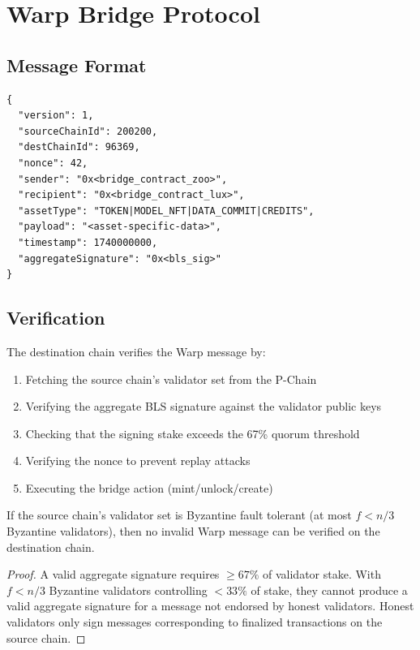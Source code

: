 \section{Warp Bridge Protocol}

\label{sec:warp}

\subsection{Message Format}

\begin{lstlisting}[basicstyle=\ttfamily\small,caption=Zoo Bridge Warp Message]
{
  "version": 1,
  "sourceChainId": 200200,
  "destChainId": 96369,
  "nonce": 42,
  "sender": "0x<bridge_contract_zoo>",
  "recipient": "0x<bridge_contract_lux>",
  "assetType": "TOKEN|MODEL_NFT|DATA_COMMIT|CREDITS",
  "payload": "<asset-specific-data>",
  "timestamp": 1740000000,
  "aggregateSignature": "0x<bls_sig>"
}
\end{lstlisting}

\subsection{Verification}

The destination chain verifies the Warp message by:

\begin{enumerate}
    \item Fetching the source chain's validator set from the P-Chain
    \item Verifying the aggregate BLS signature against the validator public keys
    \item Checking that the signing stake exceeds the 67\% quorum threshold
    \item Verifying the nonce to prevent replay attacks
    \item Executing the bridge action (mint/unlock/create)
\end{enumerate}

\begin{theorem}
If the source chain's validator set is Byzantine fault tolerant (at most $f < n/3$ Byzantine validators), then no invalid Warp message can be verified on the destination chain.
\end{theorem}

\begin{proof}
A valid aggregate signature requires $\geq 67\%$ of validator stake. With $f < n/3$ Byzantine validators controlling $< 33\%$ of stake, they cannot produce a valid aggregate signature for a message not endorsed by honest validators. Honest validators only sign messages corresponding to finalized transactions on the source chain.
\end{proof}

